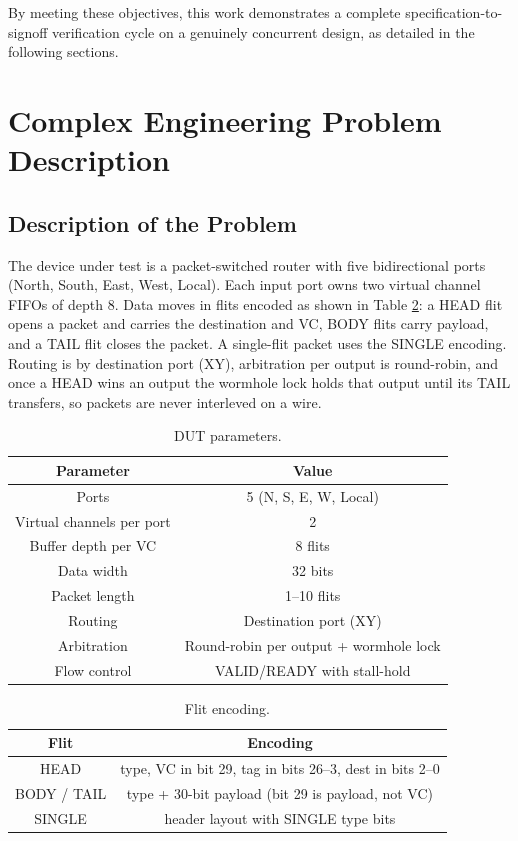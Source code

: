 \documentclass[11pt,a4paper]{report}  %
\begin{document}
By meeting these objectives, this work demonstrates a complete
specification-to-signoff verification cycle on a genuinely concurrent design,
as detailed in the following sections.

\section{Complex Engineering Problem Description}

\subsection{Description of the Problem}

The device under test is a packet-switched router with five bidirectional
ports (North, South, East, West, Local). Each input port owns two virtual
channel FIFOs of depth 8. Data moves in flits encoded as shown in
Table \ref{tab:flit}: a HEAD flit opens a packet and carries the destination
and VC, BODY flits carry payload, and a TAIL flit closes the packet. A
single-flit packet uses the SINGLE encoding. Routing is by destination port
(XY), arbitration per output is round-robin, and once a HEAD wins an output the
wormhole lock holds that output until its TAIL transfers, so packets are never
interleved on a wire.

\begin{table}[h!]
\centering
\caption{DUT parameters.}
\vspace{2mm}
\begin{tabular}{|c|c|}
\hline
\textbf{Parameter} & \textbf{Value} \\ \hline
Ports & 5 (N, S, E, W, Local) \\ \hline
Virtual channels per port & 2 \\ \hline
Buffer depth per VC & 8 flits \\ \hline
Data width & 32 bits \\ \hline
Packet length & 1--10 flits \\ \hline
Routing & Destination port (XY) \\ \hline
Arbitration & Round-robin per output + wormhole lock \\ \hline
Flow control & VALID/READY with stall-hold \\ \hline
\end{tabular}
\label{tab:dutparams}
\end{table}

\begin{table}[h!]
\centering
\caption{Flit encoding.}
\vspace{2mm}
\begin{tabular}{|c|c|}
\hline
\textbf{Flit} & \textbf{Encoding} \\ \hline
HEAD & type, VC in bit 29, tag in bits 26--3, dest in bits 2--0 \\ \hline
BODY / TAIL & type + 30-bit payload (bit 29 is payload, not VC) \\ \hline
SINGLE & header layout with SINGLE type bits \\ \hline
\end{tabular}
\label{tab:flit}
\end{table}
\end{document}
